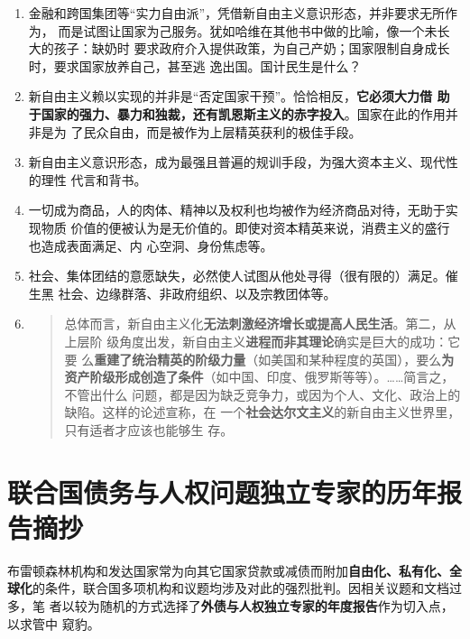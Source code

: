 \begin{enumerate}
\item 金融和跨国集团等“实力自由派”，凭借新自由主义意识形态，并非要求无所作为，
  而是试图让国家为己服务。犹如哈维在其他书中做的比喻，像一个未长大的孩子：缺奶时
  要求政府介入提供政策，为自己产奶；国家限制自身成长时，要求国家放养自己，甚至逃
  逸出国。国计民生是什么？

\item 新自由主义赖以实现的并非是“否定国家干预”。恰恰相反，\textbf{它必须大力借
    助于国家的强力、暴力和独裁，还有凯恩斯主义的赤字投入}。国家在此的作用并非是为
  了民众自由，而是被作为上层精英获利的极佳手段。

\item 新自由主义意识形态，成为最强且普遍的规训手段，为强大资本主义、现代性的理性
  代言和背书。

\item 一切成为商品，人的肉体、精神以及权利也均被作为经济商品对待，无助于实现物质
  价值的便被认为是无价值的。即使对资本精英来说，消费主义的盛行也造成表面满足、内
  心空洞、身份焦虑等。

\item 社会、集体团结的意愿缺失，必然使人试图从他处寻得（很有限的）满足。催生黑
  社会、边缘群落、非政府组织、以及宗教团体等。

\item
  \begin{quotation}
    总体而言，新自由主义化\textbf{无法刺激经济增长或提高人民生活}。第二，从上层阶
    级角度出发，新自由主义\textbf{进程而非其理论}确实是巨大的成功：它要
    么\textbf{重建了统治精英的阶级力量}（如美国和某种程度的英国），要么\textbf{为
      资产阶级形成创造了条件}（如中国、印度、俄罗斯等等）。……简言之，不管出什么
    问题，都是因为缺乏竞争力，或因为个人、文化、政治上的缺陷。这样的论述宣称，在
    一个\textbf{社会达尔文主义}的新自由主义世界里，只有适者才应该也能够生
    存。
  \end{quotation}

\end{enumerate}


\section{联合国债务与人权问题独立专家的历年报告摘抄}

布雷顿森林机构和发达国家常为向其它国家贷款或减债而附加\textbf{自由化、私有化、全
  球化}的条件，联合国多项机构和议题均涉及对此的强烈批判。因相关议题和文档过多，笔
者以较为随机的方式选择了\textbf{外债与人权独立专家的年度报告}作为切入点，以求管中
窥豹。

